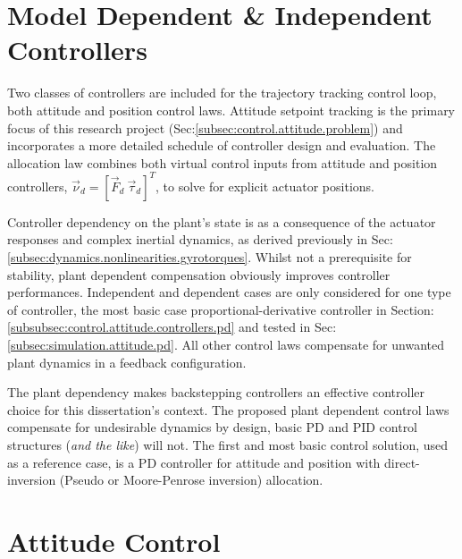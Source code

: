 \section{Model Dependent \& Independent Controllers}
Two classes of controllers are included for the trajectory tracking control loop, both attitude and position control laws. Attitude setpoint tracking is the primary focus of this research project (Sec:\ref{subsec:control.attitude.problem}) and incorporates a more detailed schedule of controller design and evaluation. The allocation law combines both virtual control inputs from attitude and position controllers, $\vec{\nu}_d=[\vec{F}_d~\vec{\tau}_d]^T$, to solve for explicit actuator positions. 
\par
Controller dependency on the plant's state is as a consequence of the actuator responses and complex inertial dynamics, as derived previously in Sec:\ref{subsec:dynamics.nonlinearities.gyrotorques}. Whilst not a prerequisite for stability, plant dependent compensation obviously improves controller performances. Independent and dependent cases are only considered for one type of controller, the most basic case proportional-derivative controller in Section:\ref{subsubsec:control.attitude.controllers.pd} and tested in Sec:\ref{subsec:simulation.attitude.pd}. All other control laws compensate for unwanted plant dynamics in a feedback configuration.
\par
The plant dependency makes backstepping controllers an effective controller choice for this dissertation's context. The proposed plant dependent control laws compensate for undesirable dynamics by design, basic PD and PID control structures (\emph{and the like}) will not. The first and most basic control solution, used as a reference case, is a PD controller for attitude and position with direct-inversion (Pseudo or Moore-Penrose inversion) allocation. 
\section{Attitude Control}
\label{sec:control.attitude}
